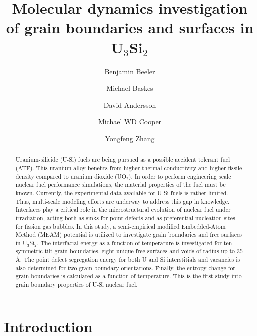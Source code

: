 \documentclass[review]{elsarticle}
\begin{document}
\begin{frontmatter}
\title{Molecular dynamics investigation of grain boundaries and surfaces in U$_{3}$Si$_{2}$}

\author[inl]{Benjamin Beeler}
\author[lanl,ucsd,msu]{Michael Baskes}
\author[lanl]{David Andersson}
\author[lanl]{Michael WD Cooper}
\author[inl]{Yongfeng Zhang}
\address[inl]{Idaho National Laboratory, Idaho Falls, ID 83415}
\address[lanl]{Los Alamos National Laboratory, Los Alamos, NM 87545}
\address[ucsd]{University of California-San Diego, San Diego, CA 92093}
\address[msu]{Mississippi State University, MS 39762}

\begin{abstract}

Uranium-silicide (U-Si) fuels are being pursued as a possible accident tolerant fuel (ATF). This uranium alloy benefits from higher thermal conductivity and higher fissile density compared to uranium dioxide (UO$_{2}$). In order to perform engineering scale nuclear fuel performance simulations, the material properties of the fuel must be known. Currently, the experimental data available for U-Si fuels is rather limited. Thus, multi-scale modeling efforts are underway to address this gap in knowledge. Interfaces play a critical role in the microstructural evolution of nuclear fuel under irradiation, acting both as sinks for point defects and as preferential nucleation sites for fission gas bubbles. In this study, a semi-empirical modified Embedded-Atom Method (MEAM) potential is utilized to investigate grain boundaries and free surfaces in U$_{3}$Si$_{2}$. The interfacial energy as a function of temperature is investigated for ten symmetric tilt grain boundaries, eight unique free surfaces and voids of radius up to 35 {\AA}. The point defect segregation energy for both U and Si interstitials and vacancies is also determined for two grain boundary orientations. Finally, the entropy change for grain boundaries is calculated as a function of temperature. This is the first study into grain boundary properties of U-Si nuclear fuel. 

\end{abstract}
\end{frontmatter}

\section{Introduction}
\end{document}
